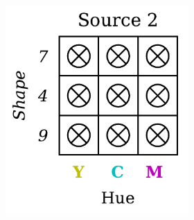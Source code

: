 \begin{definition}
\begin{figure}[H]
\begin{subfigure}[b]{0.45\textwidth}
\begin{subfigure}[b]{0.48\textwidth}
                \includegraphics[width=\textwidth]{img/datasets/ZSO_fact=hue_env=1.pdf}
            \end{subfigure}
        \end{subfigure}
        \hfill
        \begin{subfigure}[b]{0.45\textwidth}
            \centering
            \begin{subfigure}[b]{0.48\textwidth}
                \centering

\end{subfigure}
\end{subfigure}
\end{figure}
\end{definition}

